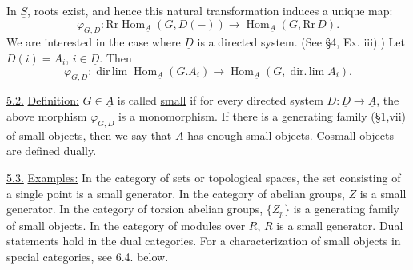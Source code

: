 
In $\underline{S}$, roots exist, and hence this natural transformation
induces a unique map:
\[
\varphi_{G,D}:\mathrm{Rr}\operatorname{Hom}_{\underline{A}}(G,D(-))
\longrightarrow\operatorname{Hom}_{\underline{A}}(G,\mathrm{Rr}\,D).
\]
We are interested in the case where $\underline{D}$ is a directed system.
(See \S 4, Ex. iii).) Let $D(i)=A_i$, $i\in\underline{D}$. Then
\[
\varphi_{G,D}:\operatorname{dir\,lim}\operatorname{Hom}_{\underline{A}}(G.A_i)
\longrightarrow\operatorname{Hom}_{\underline{A}}(G,\operatorname{dir.\,lim}A_i).
\]

\uline{5.2.} \uline{Definition:} $G\in\underline{A}$ is called \uline{small} if for every directed
system $D:\underline{D}\longrightarrow\underline{A}$, the above morphism $\varphi_{G,D}$ is a monomorphism.
If there is a generating family (\S 1,vii) of small objects, then
we say that $\underline{A}$ \uline{has enough} small objects. \uline{Cosmall} objects are
defined dually.

\uline{5.3.} \uline{Examples:} In the category of sets or topological spaces,
the set consisting of a single point is a small generator. In
the category of abelian groups, $Z$ is a small generator. In
the category of torsion abelian groups, $\{Z_p\}$ is a generating
family of small objects. In the category of modules over $R$,
$R$ is a small generator. Dual statements hold in the dual
categories. For a characterization of small objects in special
categories, see 6.4. below.
